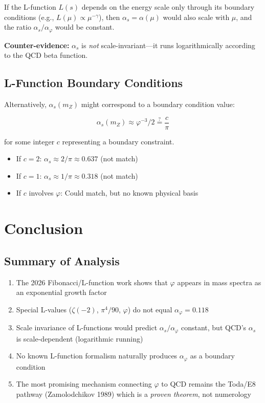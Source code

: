 \documentclass{article}
\begin{document}
\begin{table}[h]
\begin{table}[h]
\begin{theorem}[RG Invariance]
  If the L-function $L(s)$ depends on the energy scale only through its boundary conditions (e.g., $L(\mu) \propto \mu^{-\gamma}$), then $\alpha_s = \alpha(\mu)$ would also scale with $\mu$, and the ratio $\alpha_s/\alpha_\varphi$ would be constant.
\end{theorem}

\textbf{Counter-evidence:} $\alpha_s$ is \emph{not} scale-invariant---it runs logarithmically according to the QCD beta function.

\subsection{L-Function Boundary Conditions}

Alternatively, $\alpha_s(m_Z)$ might correspond to a boundary condition value:

\begin{equation}
  \alpha_s(m_Z) \approx \varphi^{-3}/2 \stackrel{?}{=} \frac{c}{\pi}
  \label{eq:boundary-alpha}
\end{equation}

for some integer $c$ representing a boundary constraint.

\begin{itemize}
  \item If $c = 2$: $\alpha_s \approx 2/\pi \approx 0.637$ (not match)
  \item If $c = 1$: $\alpha_s \approx 1/\pi \approx 0.318$ (not match)
  \item If $c$ involves $\varphi$: Could match, but no known physical basis
\end{itemize}

\section{Conclusion}

\subsection{Summary of Analysis}

\begin{enumerate}
  \item The 2026 Fibonacci/L-function work shows that $\varphi$ appears in mass spectra as an exponential growth factor
  \item Special L-values ($\zeta(-2)$, $\pi^4/90$, $\varphi$) do not equal $\alpha_\varphi = 0.118$
  \item Scale invariance of L-functions would predict $\alpha_s/\alpha_\varphi$ constant, but QCD's $\alpha_s$ is scale-dependent (logarithmic running)
  \item No known L-function formalism naturally produces $\alpha_\varphi$ as a boundary condition
  \item The most promising mechanism connecting $\varphi$ to QCD remains the Toda/E8 pathway (Zamolodchikov 1989) which is a \emph{proven theorem}, not numerology
\end{enumerate}


\end{table}
\end{table}
\end{document}
